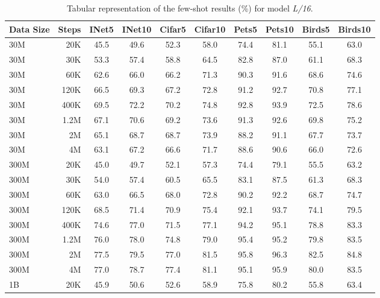 \begin{table}[h]
  \setlength{\tabcolsep}{5pt}
  \setlength{\extrarowheight}{5pt}
  \renewcommand{\arraystretch}{0.75}
  \centering
  \caption{Tabular representation of the few-shot results (\%) for model \emph{L/16}.}\label{tbl:l_16}
  \begin{tabulary}{1.0\textwidth}{l r c c c c c c c c}
    \toprule[1pt]
    \bf{Data Size} & \bf{Steps} & \bf{INet5} & \bf{INet10} & \bf{Cifar5} & \bf{Cifar10} & \bf{Pets5} & \bf{Pets10} & \bf{Birds5} & \bf{Birds10} \\
    \midrule
30M   & 20K   & 45.5 & 49.6 & 52.3 & 58.0 & 74.4 & 81.1 & 55.1 & 63.0 \\
30M   & 30K   & 53.3 & 57.4 & 58.8 & 64.5 & 82.8 & 87.0 & 61.1 & 68.3 \\
30M   & 60K   & 62.6 & 66.0 & 66.2 & 71.3 & 90.3 & 91.6 & 68.6 & 74.6 \\
30M   & 120K  & 66.5 & 69.3 & 67.2 & 72.8 & 91.2 & 92.7 & 70.8 & 77.1 \\
30M   & 400K  & 69.5 & 72.2 & 70.2 & 74.8 & 92.8 & 93.9 & 72.5 & 78.6 \\
30M   & 1.2M    & 67.1 & 70.6 & 69.2 & 73.6 & 91.3 & 92.6 & 69.8 & 75.2 \\
30M   & 2M    & 65.1 & 68.7 & 68.7 & 73.9 & 88.2 & 91.1 & 67.7 & 73.7 \\
30M   & 4M    & 63.1 & 67.2 & 66.6 & 71.7 & 88.6 & 90.6 & 66.0 & 72.6 \\
\midrule[0.25pt]
300M  & 20K   & 45.0 & 49.7 & 52.1 & 57.3 & 74.4 & 79.1 & 55.5 & 63.2 \\
300M  & 30K   & 54.0 & 57.4 & 60.5 & 65.5 & 83.1 & 87.5 & 61.3 & 68.3 \\
300M  & 60K   & 63.0 & 66.5 & 68.0 & 72.8 & 90.2 & 92.2 & 68.7 & 74.7 \\
300M  & 120K  & 68.5 & 71.4 & 70.9 & 75.4 & 92.1 & 93.7 & 74.1 & 79.5 \\
300M  & 400K  & 74.6 & 77.0 & 71.5 & 77.1 & 94.2 & 95.1 & 78.8 & 83.3 \\
300M  & 1.2M    & 76.0 & 78.0 & 74.8 & 79.0 & 95.4 & 95.2 & 79.8 & 83.5 \\
300M  & 2M    & 77.5 & 79.5 & 77.0 & 81.5 & 95.8 & 96.3 & 82.5 & 84.8 \\
300M  & 4M    & 77.0 & 78.7 & 77.4 & 81.1 & 95.1 & 95.9 & 80.0 & 83.5 \\
\midrule[0.25pt]
1B    & 20K   & 45.9 & 50.6 & 52.6 & 58.9 & 75.8 & 80.2 & 55.8 & 63.4 \\

\end{tabulary}
\end{table}
